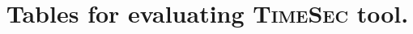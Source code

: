 \documentclass[runningheads]{llncs}
\title{Tables for evaluating \textsc{TimeSec} tool.}
\begin{document}
\maketitle

\newcommand{\depslabel}{\textsc{Deps}}
\newcommand{\invlabel}{\textsc{Inv}}
\newcommand{\lplabel}{\textsc{LP}}
\newcommand{\nodepnoopt}{\textsc{Deps}}
\newcommand{\depnoopt}{\textsc{Opts}}
\newcommand{\depopt}{\textsc{Full}}
\newcommand{\toolname}{\textsc{TimeSec}}
\newcommand{\bignum}{\textsc{S2N-Bignum}}
\newcommand{\spacearound}[1]{\;#1\;}

\setcounter{table}{2} %





\end{document}
